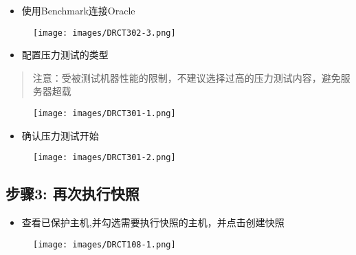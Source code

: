 \begin{itemize}
\item 使用Benchmark连接Oracle

\end{itemize}

\begin{figure}[htbp]
\centering
\texttt{[image: images/DRCT302-3.png]}
\end{figure}

\begin{itemize}
\item 配置压力测试的类型

\end{itemize}

\begin{quote}

注意：受被测试机器性能的限制，不建议选择过高的压力测试内容，避免服务器超载
\end{quote}

\begin{figure}[htbp]
\centering
\texttt{[image: images/DRCT301-1.png]}
\end{figure}

\begin{itemize}
\item 确认压力测试开始

\end{itemize}

\begin{figure}[htbp]
\centering
\texttt{[image: images/DRCT301-2.png]}
\end{figure}

\subsection{步骤3: 再次执行快照}
\label{步骤3:再次执行快照}

\begin{itemize}
\item 查看已保护主机,并勾选需要执行快照的主机，并点击创建快照

\end{itemize}

\begin{figure}[htbp]
\centering
\texttt{[image: images/DRCT108-1.png]}
\end{figure}

